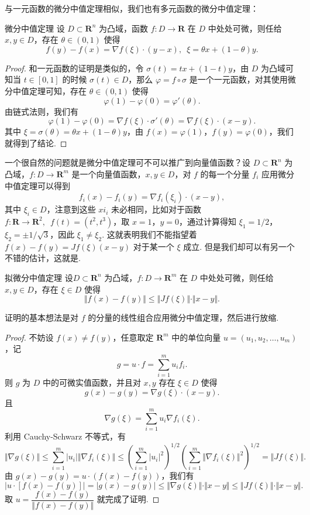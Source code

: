 与一元函数的微分中值定理相似，我们也有多元函数的微分中值定理：

\begin{theorem}{微分中值定理}{}
    设 $D\subset \mathbf{R}^n$ 为凸域，函数 $f\colon D\to \mathbf{R}$ 在 $D$ 中处处可微，则任给 $x,y\in D$，存在 $\theta\in (0, 1)$ 使得\[f(y) - f(x) = \nabla f(\xi)\cdot(y-x),\enspace \xi=\theta x + (1-\theta)y.\]
\end{theorem}

\begin{proof}
    和一元函数的证明是类似的，令 $\sigma(t) = tx + (1 - t)y$，由 $D$ 为凸域可知当 $t\in [0, 1]$ 的时候 $\sigma(t)\in D$，那么 $\varphi = f\circ \sigma$ 是一个一元函数，对其使用微分中值定理可知，存在 $\theta\in (0, 1)$ 使得 \[\varphi(1) - \varphi(0) = \varphi'(\theta).\]
    由链式法则，我们有 \[\varphi(1) - \varphi(0) = \nabla f(\xi)\cdot\sigma'(\theta) = \nabla f(\xi)\cdot(x - y).\]
    其中 $\xi = \sigma(\theta) = \theta x + (1 - \theta)y$，由 $f(x) = \varphi(1)$，$f(y) = \varphi(0)$，我们就得到了结论.
\end{proof}

一个很自然的问题就是微分中值定理可不可以推广到向量值函数？设 $D\subset \mathbf{R}^n$ 为凸域，$f\colon D\to \mathbf{R}^m$ 是一个向量值函数，$x, y\in D$，对 $f$ 的每一个分量 $f_i$ 应用微分中值定理可以得到\[f_i(x) - f_i(y) = \nabla f_i(\xi_i)\cdot(x-y),\]其中 $\xi_i\in D$，注意到这些 $xi_i$ 未必相同，比如对于函数 $f\colon \mathbf{R}\to\mathbf{R}^2,\enspace f(t) = (t^2, t^3)$，取 $x = 1$，$y = 0$，通过计算得知 $\xi_1 = 1/2$，$\xi_2 = \pm1/\sqrt{3}$，因此 $\xi_1 \neq \xi_2$. 这就表明我们不能指望着 $f(x) - f(y) = Jf(\xi)(x-y)$ 对于某一个 $\xi$ 成立. 但是我们却可以有另一个不错的估计，这就是.

\begin{theorem}{拟微分中值定理}{}
    设$D\subset \mathbf{R}^n$ 为凸域，$f\colon D\to \mathbf{R}^m$ 在 $D$ 中处处可微，则任给 $x, y\in D$，存在 $\xi\in D$ 使得\[\Vert f(x) - f(y)\Vert \leqslant \Vert Jf(\xi)\Vert\cdot \Vert x - y\Vert.\]
\end{theorem}

证明的基本想法是对 $f$ 的分量的线性组合应用微分中值定理，然后进行放缩.

\begin{proof}
    不妨设 $f(x) \neq f(y)$，任意取定 $\mathbf{R}^m$ 中的单位向量 $u = (u_1, u_2, \ldots, u_m)$，记\[g = u\cdot f = \sum_{i = 1}^{m}u_if_i.\]
    则 $g$ 为 $D$ 中的可微实值函数，并且对 $x, y$ 存在 $\xi\in D$ 使得 \[g(x) - g(y) = \nabla g(\xi)\cdot (x - y).\]
    且 \[\nabla g(\xi) = \sum_{i = 1}^{m}u_i\nabla f_i(\xi).\]
    利用 Cauchy-Schwarz 不等式，有 \[\Vert \nabla g(\xi)\Vert \leqslant \sum_{i = 1}^m\vert u_i\vert \Vert \nabla f_i(\xi)\Vert \leqslant \left(\sum_{i = 1}^m\vert u_i\vert^2\right)^{1/2}\left(\sum_{i = 1}^m\Vert \nabla f_i(\xi)\Vert^2\right)^{1/2} = \Vert Jf(\xi)\Vert.\]
    由 $g(x) - g(y) = u\cdot (f(x) - f(y))$，我们有 \[\vert u \cdot [f(x) - f(y)]\vert = \vert g(x) - g(y) \vert \leqslant \Vert \nabla g(\xi)\Vert \cdot \Vert x - y\Vert \leqslant \Vert Jf(\xi)\Vert\cdot \Vert x - y\Vert.\]
    取 $u = \dfrac{f(x) - f(y)}{\Vert f(x) - f(y)\Vert}$ 就完成了证明.
\end{proof}

